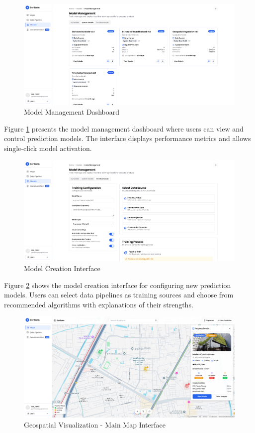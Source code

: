 \begin{figure}[h]
\centering
\includegraphics[width=1\textwidth]{assets/ui/models-models-list.png}
\caption{Model Management Dashboard}
\label{fig:models-models-list}
\end{figure}

Figure \ref{fig:models-models-list} presents the model management dashboard where users can view and control prediction models. The interface displays performance metrics and allows single-click model activation.

\begin{figure}[h]
\centering
\includegraphics[width=1\textwidth]{assets/ui/models-new-model.png}
\caption{Model Creation Interface}
\label{fig:models-new-model}
\end{figure}

Figure \ref{fig:models-new-model} shows the model creation interface for configuring new prediction models. Users can select data pipelines as training sources and choose from recommended algorithms with explanations of their strengths.

\begin{figure}[h]
\centering
\includegraphics[width=1\textwidth]{assets/ui/map-page-main.png}
\caption{Geospatial Visualization - Main Map Interface}
\label{fig:map-page-main}
\end{figure}

